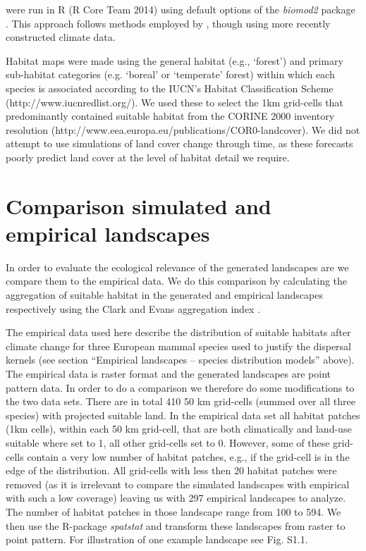 \documentclass[12pt,pdftex]{article}
\begin{document}
were run in  \textsf{R} (R Core Team 2014) using default options of the {\em biomod2} package \citep{Thuiller2009a}. This approach follows methods employed by \cite{Araujo2011a}, though using more recently constructed climate data.

Habitat maps were made using the general habitat (e.g., `forest') and primary sub-habitat categories (e.g. ‘boreal’ or ‘temperate’ forest) within which each species is associated according to the IUCN’s Habitat Classification Scheme (http://www.iucnredlist.org/). We used these to select the 1km grid-cells that predominantly contained suitable habitat from the CORINE 2000 inventory resolution (http://www.eea.europa.eu/publications/COR0-landcover). We did not attempt to use simulations of land cover change through time, as these forecasts poorly predict land cover at the level of habitat detail we require. 

\section*{Comparison simulated and empirical landscapes}
In order to evaluate the ecological relevance of the generated landscapes are we compare them to the empirical data. We do this comparison by calculating the aggregation of suitable habitat in the generated and empirical landscapes respectively using the Clark and Evans aggregation index \citep{Clark1954}.

The empirical data used here describe the distribution of suitable habitats after climate change for three European mammal species used to justify the dispersal kernels (see section ``Empirical landscapes -- species distribution models'' above). The empirical data is raster format and the generated landscapes are point pattern data. In order to do a comparison we therefore do some modifications to the two data sets. There are in total 410 50 km grid-cells (summed over all three species) with projected suitable land.  In the empirical data set all habitat patches (1km cells), within each  50 km grid-cell, that are both climatically and land-use suitable where set to 1, all other grid-cells set to 0. However, some of these grid-cells contain a very low number of habitat patches, e.g., if the grid-cell is in the edge of the distribution. All grid-cells with less then 20 habitat patches were removed (as it is irrelevant to compare the simulated landscapes with empirical with such a low coverage) leaving us with 297 empirical landscapes to analyze. The number of habitat patches in those landscape range from 100 to 594. We then use the R-package {\em spatstat} \citep{spatstat} and transform these landscapes from raster to point pattern. For illustration of one example landscape see Fig. S1.1.
\end{document}
